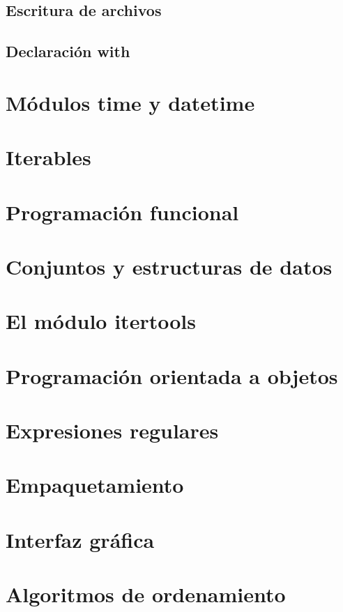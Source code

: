 \documentclass{article}
\begin{document}
\subsection{Escritura de archivos}

\subsection{Declaración with}

\section{Módulos time y datetime}

\section{Iterables}

\section{Programación funcional}

\section{Conjuntos y estructuras de datos}

\section{El módulo itertools}

\section{Programación orientada a objetos}

\section{Expresiones regulares}

\section{Empaquetamiento}

\section{Interfaz gráfica}

\section{Algoritmos de ordenamiento}
\end{document}
